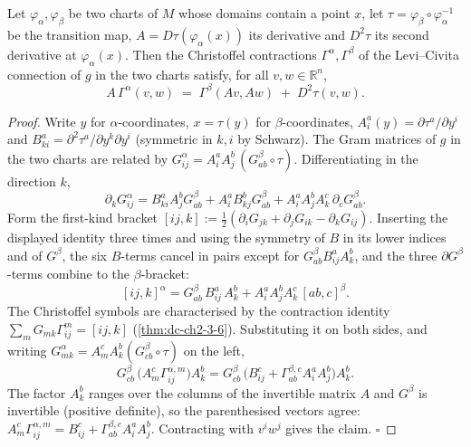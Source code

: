 \begin{lemma}
  \label{lem:dc-ch7-2-8-christoffel-transform}
  \leanok
  Let $\varphi_\alpha,\varphi_\beta$ be two charts of $M$ whose domains contain a
  point $x$, let $\tau=\varphi_\beta\circ\varphi_\alpha^{-1}$ be the transition map,
  $A=D\tau(\varphi_\alpha(x))$ its derivative and $D^2\tau$ its second derivative at
  $\varphi_\alpha(x)$. Then the Christoffel contractions
  $\Gamma^\alpha,\Gamma^\beta$ of the Levi–Civita connection of $g$ in the two
  charts satisfy, for all $v,w\in\mathbb R^n$,
  $$
  A\,\Gamma^\alpha(v,w)\;=\;\Gamma^\beta(Av,Aw)\;+\;D^2\tau(v,w).
  $$
\end{lemma}
\begin{proof}
  \leanok
  Write $y$ for $\alpha$-coordinates, $x=\tau(y)$ for $\beta$-coordinates,
  $A^a_i(y)=\partial\tau^a/\partial y^i$ and
  $B^a_{ki}=\partial^2\tau^a/\partial y^k\partial y^i$ (symmetric in $k,i$ by
  Schwarz). The Gram matrices of $g$ in the two charts are related by
  $G^\alpha_{ij}=A^a_iA^b_j\,(G^\beta_{ab}\circ\tau)$. Differentiating in the
  direction $k$,
  $$
  \partial_kG^\alpha_{ij}
   = B^a_{ki}A^b_jG^\beta_{ab}+A^a_iB^b_{kj}G^\beta_{ab}
     +A^a_iA^b_jA^c_k\,\partial_cG^\beta_{ab}.
  $$
  Form the first-kind bracket
  $[ij,k]:=\tfrac12(\partial_iG_{jk}+\partial_jG_{ik}-\partial_kG_{ij})$. Inserting
  the displayed identity three times and using the symmetry of $B$ in its lower
  indices and of $G^\beta$, the six $B$-terms cancel in pairs except for
  $G^\beta_{ab}B^a_{ij}A^b_k$, and the three $\partial G^\beta$-terms combine to the
  $\beta$-bracket:
  $$
  [ij,k]^\alpha=G^\beta_{ab}\,B^a_{ij}\,A^b_k+A^a_iA^b_jA^c_k\,[ab,c]^\beta .
  $$
  The Christoffel symbols are characterised by the contraction identity
  $\sum_mG_{mk}\Gamma^m_{ij}=[ij,k]$ (\cref{thm:dc-ch2-3-6}). Substituting it on
  both sides, and writing $G^\alpha_{mk}=A^c_mA^b_k(G^\beta_{cb}\circ\tau)$ on the
  left,
  $$
  G^\beta_{cb}\,\bigl(A^c_m\Gamma^{\alpha,m}_{ij}\bigr)A^b_k
   = G^\beta_{cb}\,\bigl(B^c_{ij}
     +\Gamma^{\beta,c}_{ab}A^a_iA^b_j\bigr)A^b_k .
  $$
  The factor $A^b_k$ ranges over the columns of the invertible matrix $A$ and
  $G^\beta$ is invertible (positive definite), so the parenthesised vectors agree:
  $A^c_m\Gamma^{\alpha,m}_{ij}=B^c_{ij}+\Gamma^{\beta,c}_{ab}A^a_iA^b_j$.
  Contracting with $v^iw^j$ gives the claim. $\square$
\end{proof}

